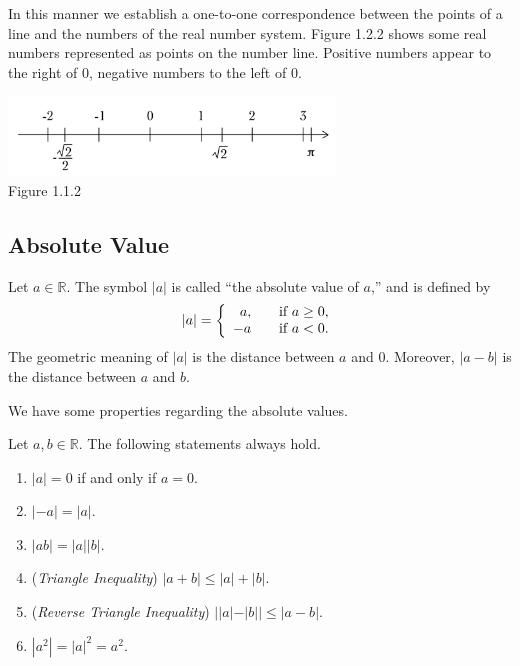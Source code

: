 \documentclass[11pt]{book}
\theoremstyle{break}
\theoremstyle{no_label}
\newcommand{\bbR}{\mathbb{R}}
\newcommand{\figtag}[1]{\\[-1.2em]Figure {#1}}
\numberwithin{equation}{section}
\begin{document}
In this manner we establish a one-to-one correspondence between the points of a line and the numbers of the real number system. Figure 1.2.2 shows some real numbers represented as points on the number line. Positive numbers appear to the right of $0$, negative numbers to the left of $0$.

\begin{center}
    \includegraphics[width=0.65\textwidth]{number_line_example.JPG}\figtag{1.1.2}
\end{center}

\subsection*{Absolute Value}

Let $a\in\bbR$. The symbol $|a|$ is called ``the absolute value of $a$,'' and is defined by \vspace*{0.5em} \begin{equation*}
    |a|=\left\{\begin{array}{rl}a,&\quad\text{if $a\geq0$,}\\-a&\quad\text{if $a<0$.}\end{array}\right.\\[0.5em]
\end{equation*} The geometric meaning of $|a|$ is the distance between $a$ and $0$. Moreover, $|a-b|$ is the distance between $a$ and $b$.

We have some properties regarding the absolute values. 

\begin{theorem}
    Let $a, b\in\bbR$. The following statements always hold.
    \begin{enumerate}
        \item $|a|=0$ if and only if $a=0$.
        \item $|-a|=|a|$.
        \item $|ab|=|a||b|$.
        \item (\textit{Triangle Inequality}) $|a+b|\leq|a|+|b|$.
        \item (\textit{Reverse Triangle Inequality}) $||a|-|b||\leq|a-b|$.
        \item $|a^2|=|a|^2=a^2$.
    \end{enumerate}
\end{theorem}
\end{document}
